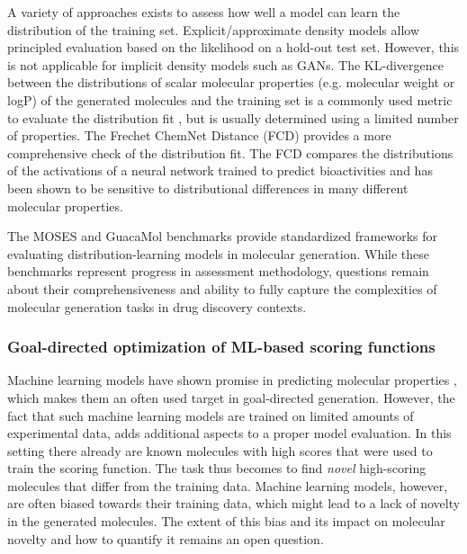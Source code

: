 A variety of approaches exists to assess how well a model can learn the distribution of the training
set. Explicit/approximate density models allow principled evaluation based on the likelihood on a
hold-out test set. However, this is not applicable for implicit density models such as GANs. The
KL-divergence between the distributions of scalar molecular properties (e.g. molecular weight or
logP) of the generated molecules and the training set is a commonly used metric to evaluate the
distribution fit \citep{brownGuacaMolBenchmarkingModels2019}, but is usually determined using a
limited number of properties. The Frechet ChemNet Distance (FCD)
\citep{preuerFrechetChemNetDistance2018} provides a more comprehensive check of the distribution
fit. The FCD compares the distributions of the activations of a neural network trained to predict
bioactivities and has been shown to be sensitive to distributional differences in many different
molecular properties.

The MOSES \citep{polykovskiyMolecularSetsMOSES2020} and GuacaMol
\citep{brownGuacaMolBenchmarkingModels2019} benchmarks provide standardized frameworks for
evaluating distribution-learning models in molecular generation. While these benchmarks represent
progress in assessment methodology, questions remain about their comprehensiveness and ability to
fully capture the complexities of molecular generation tasks in drug discovery contexts.

\subsubsection{Goal-directed optimization of ML-based scoring functions}
Machine learning models have shown promise in predicting molecular properties
\citep{mayrDeepToxToxicityPrediction2016,klambauerMachineLearningDrug2019,vamathevanApplicationsMachineLearning2019,chenRiseDeepLearning2018,stokesDeepLearningApproach2020},
which makes them an often used target in goal-directed generation. However, the fact that such
machine learning models are trained on limited amounts of experimental data, adds additional aspects
to a proper model evaluation. In this setting there already are known molecules with high scores
that were used to train the scoring function. The task thus becomes to find \emph{novel}
high-scoring molecules that differ from the training data. Machine learning models, however, are
often biased towards their training data, which might lead to a lack of novelty in the generated
molecules. The extent of this bias and its impact on molecular novelty and how to quantify it
remains an open question.

